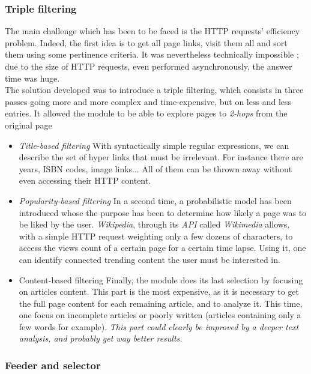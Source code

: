 \documentclass[11pt]{article}
\theoremstyle{plain}
\theoremstyle{definition}
\theoremstyle{remark}
\begin{document}
\subsubsection{Triple filtering}

The main challenge which has been to be faced is the HTTP requests' efficiency problem. Indeed, the first idea is to get all page links, visit them all and sort them using some pertinence criteria. It was nevertheless technically impossible ; due to the size of HTTP requests, even performed asynchronously, the answer time was huge. \\

The solution developed was to introduce a triple filtering, which consists in three passes going more and more complex and time-expensive, but on less and less entries. It allowed the module to be able to explore pages to \textit{2-hops} from the original page

\begin{itemize}
\item \textit{Title-based filtering} With syntactically simple regular expressions, we can describe the set of hyper links that must be irrelevant. For instance there are years, ISBN codes, image links... All of them can be thrown away without even accessing their HTTP content.
\item \textit{Popularity-based filtering} In a second time, a probabilistic model has been introduced whose the purpose has been to determine how likely a page was to be liked by the user. \textit{Wikipedia}, through its \textit{API} called \textit{Wikimedia} allows, with a simple HTTP request weighting only a few dozens of characters, to access the views count of a certain page for a certain time lapse. Using it, one can identify connected trending content the user must be interested in.
\item {Content-based filtering} Finally, the module does its last selection by focusing on articles content. This part is the most expensive, as it is necessary to get the full page content for each remaining article, and to analyze it. This time, one focus on incomplete articles or poorly written (articles containing only a few words for example). \textit{This part could clearly be improved by a deeper text analysis, and probably get way better results.}
\end{itemize}

\subsubsection{Feeder and selector}
\end{document}
